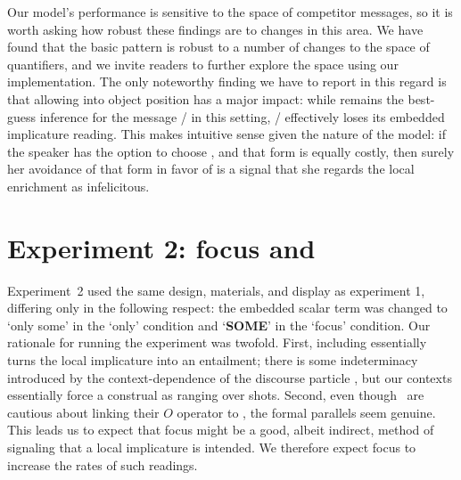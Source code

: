 \documentclass[leqno]{article}
\begin{document}
Our model's performance is sensitive to the space of competitor
messages, so it is worth asking how robust these findings are to
changes in this area. We have found that the basic pattern is robust
to a number of changes to the space of quantifiers, and we invite
readers to further explore the space using our implementation.  The
only noteworthy finding we have to report in this regard is that
allowing  into object position has a major impact:
while  remains the best-guess inference for the message
/ in this setting, / effectively loses its embedded implicature reading.
This makes intuitive sense given the nature of the model: if the
speaker has the option to choose , and
that form is equally costly, then surely her avoidance of that form in
favor of  is a signal that she regards the
local enrichment as infelicitous.



\section{Experiment 2: focus and }\label{sec:exp2}


Experiment~2 used the same design, materials, and display as
experiment 1, differing only in the following respect: the embedded
scalar term  was changed to `only some' in the `only'
condition and `\textbf{SOME}' in the `focus' condition. Our rationale
for running the experiment was twofold. First, including 
essentially turns the local implicature into an entailment; there is
some indeterminacy introduced by the context-dependence of the
discourse particle , but our contexts essentially force a
construal as  ranging over shots.  Second, even though
\CFS\ are cautious about linking their $O$ operator to ,
the formal parallels seem genuine. This leads us to expect that focus
might be a good, albeit indirect, method of signaling that a local
implicature is intended. We therefore expect focus to increase the
rates of such readings.

\end{document}
